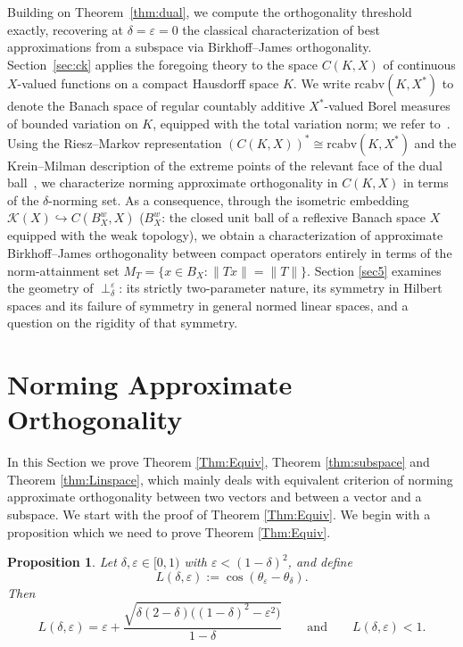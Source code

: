 \documentclass[11pt, reqno]{amsart}
\newtheorem{proposition}[theorem]{Proposition}
\theoremstyle{definition}
\newcommand{\nperp}{\perp_{\delta}^\varepsilon}
\begin{document}
\noindent Building on Theorem~\ref{thm:dual}, we compute the
orthogonality threshold exactly, recovering at $\delta = \varepsilon = 0$ 
the classical characterization of best approximations from a subspace via 
Birkhoff--James orthogonality. Section~\ref{sec:ck} applies the foregoing theory to the space $C(K,X)$ of continuous $X$-valued functions on a compact Hausdorff space $K$. We write $\mathrm{rcabv}(K, X^*)$ to denote the Banach space of regular countably additive 
$X^*$-valued Borel measures of bounded variation on $K$, equipped with the total 
variation norm; we refer to~\cite{CemMen}. Using the Riesz--Markov representation $(C(K,X))^* \cong \mathrm{rcabv}(K,X^*)$ and the Krein--Milman description of the extreme points of the relevant face of the dual ball~\cite{ruess, Lima}, we characterize norming approximate orthogonality in $C(K,X)$ in terms of the $\delta$-norming set. As a 
consequence, through the isometric embedding $\mathcal{K}(X) \hookrightarrow C(B_X^w, X)$ ($B_X^w$: the closed unit ball of a reflexive Banach space $X$ equipped with the 
weak topology), we obtain a characterization of approximate Birkhoff--James 
orthogonality between compact operators entirely in terms of the norm-attainment 
set $M_T = \{x \in  B_X : \|Tx\| = \|T\|\}$. Section \ref{sec5} examines
the geometry of $\nperp$: its strictly two-parameter nature, its symmetry in Hilbert
spaces and its failure of symmetry in general normed linear spaces, and a question on the
rigidity of that symmetry.


\section{Norming Approximate Orthogonality}\label{sec:norming}

\noindent In this Section we prove Theorem \ref{Thm:Equiv}, Theorem \ref{thm:subspace} and Theorem \ref{thm:Linspace}, which mainly deals with equivalent criterion of norming approximate orthogonality between two vectors and between a vector and a subspace. We start with the proof of Theorem \ref{Thm:Equiv}. We begin with a proposition which we need to prove Theorem \ref{Thm:Equiv}.

\begin{proposition}\label{prop:L}
Let $\delta,\varepsilon \in [0,1)$ with $\varepsilon < (1-\delta)^2$, and define
\[
L(\delta,\varepsilon) := \cos(\theta_\varepsilon-\theta_\delta).
\]
Then
\[
L(\delta,\varepsilon) = \varepsilon +
\frac{\sqrt{\delta(2-\delta)\bigl((1-\delta)^2-\varepsilon^2\bigr)}}{1-\delta}
\qquad\text{and}\qquad L(\delta,\varepsilon)<1 .
\]
\end{proposition}
\end{document}
